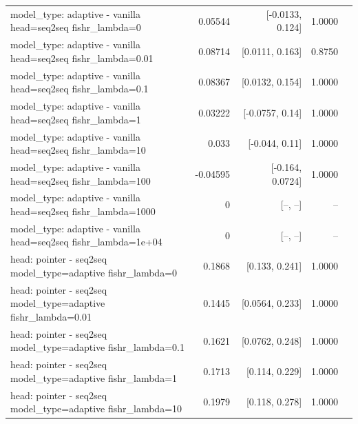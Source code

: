 \documentclass[10pt]{article}
\makeatletter
\newcommand{\stackcell}[1]{\begin{tabular}[t]{@{}l@{}}#1\end{tabular}}
\makeatother
\begin{document}
{\begin{longtable}{lrrrl}
\stackcell{model\_type: adaptive - vanilla\\\footnotesize head=seq2seq fishr\_lambda=0 } & 0.05544 & [-0.0133, 0.124] & 1.0000 & \\
\stackcell{model\_type: adaptive - vanilla\\\footnotesize head=seq2seq fishr\_lambda=0.01 } & 0.08714 & [0.0111, 0.163] & 0.8750 & \\
\stackcell{model\_type: adaptive - vanilla\\\footnotesize head=seq2seq fishr\_lambda=0.1 } & 0.08367 & [0.0132, 0.154] & 1.0000 & \\
\stackcell{model\_type: adaptive - vanilla\\\footnotesize head=seq2seq fishr\_lambda=1 } & 0.03222 & [-0.0757, 0.14] & 1.0000 & \\
\stackcell{model\_type: adaptive - vanilla\\\footnotesize head=seq2seq fishr\_lambda=10 } & 0.033 & [-0.044, 0.11] & 1.0000 & \\
\stackcell{model\_type: adaptive - vanilla\\\footnotesize head=seq2seq fishr\_lambda=100 } & -0.04595 & [-0.164, 0.0724] & 1.0000 & \\
\stackcell{model\_type: adaptive - vanilla\\\footnotesize head=seq2seq fishr\_lambda=1000 } & 0 & [--, --] & -- & \\
\stackcell{model\_type: adaptive - vanilla\\\footnotesize head=seq2seq fishr\_lambda=1e+04 } & 0 & [--, --] & -- & \\
\stackcell{head: pointer - seq2seq\\\footnotesize model\_type=adaptive fishr\_lambda=0 } & 0.1868 & [0.133, 0.241] & 1.0000 & \\
\stackcell{head: pointer - seq2seq\\\footnotesize model\_type=adaptive fishr\_lambda=0.01 } & 0.1445 & [0.0564, 0.233] & 1.0000 & \\
\stackcell{head: pointer - seq2seq\\\footnotesize model\_type=adaptive fishr\_lambda=0.1 } & 0.1621 & [0.0762, 0.248] & 1.0000 & \\
\stackcell{head: pointer - seq2seq\\\footnotesize model\_type=adaptive fishr\_lambda=1 } & 0.1713 & [0.114, 0.229] & 1.0000 & \\
\stackcell{head: pointer - seq2seq\\\footnotesize model\_type=adaptive fishr\_lambda=10 } & 0.1979 & [0.118, 0.278] & 1.0000 & \\

\end{longtable}}
\end{document}
